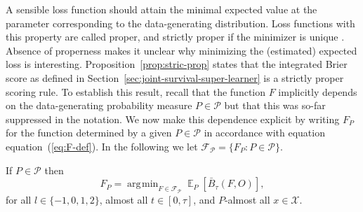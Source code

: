 \documentclass[alpha-refs]{wiley-article}
\DeclareMathOperator{\E}{\mathbb{E}} %
\newcommand{\1}{\mathds{1}}
\DeclareMathOperator*{\argmin}{\arg\!\min}
\begin{document}
A sensible loss function should attain the minimal expected value at
the parameter corresponding to the data-generating distribution. Loss
functions with this property are called proper, and strictly proper if
the minimizer is unique \citep{gneiting2007strictly}. Absence of
properness makes it unclear why minimizing the (estimated) expected
loss is interesting.  Proposition~\ref{prop:stric-prop} states that
the integrated Brier score as defined in
Section~\ref{sec:joint-survival-super-learner} is a strictly proper
scoring rule. To establish this result, recall that the function \(F\)
implicitly depends on the data-generating probability measure
\(P\in\mathcal P\) but that this was so-far suppressed in the
notation. We now make this dependence explicit by writing \(F_P\) for
the function determined by a given \(P \in\mathcal{P}\) in accordance
with equation equation~(\ref{eq:F-def}). In the following we let \(
\mathcal{F}_{\mathcal{P}} = \{F_P : P \in \mathcal{P}\} \).

\begin{proposition}
  \label{prop:stric-prop}
  If \(P \in\mathcal{P}\) then
  \begin{equation*}
    F_P = \argmin_{F \in \mathcal{F}_{\mathcal{P}}}
    \E_P{[\bar{B}_\tau(F, O)]}
    ,
  \end{equation*}
  for all \( l \in \{-1, 0, 1, 2 \} \), almost all
  \( t \in [0,\tau] \), and \( P \)-almost all
  \( x \in \mathcal{X} \).
\end{proposition}
\end{document}
